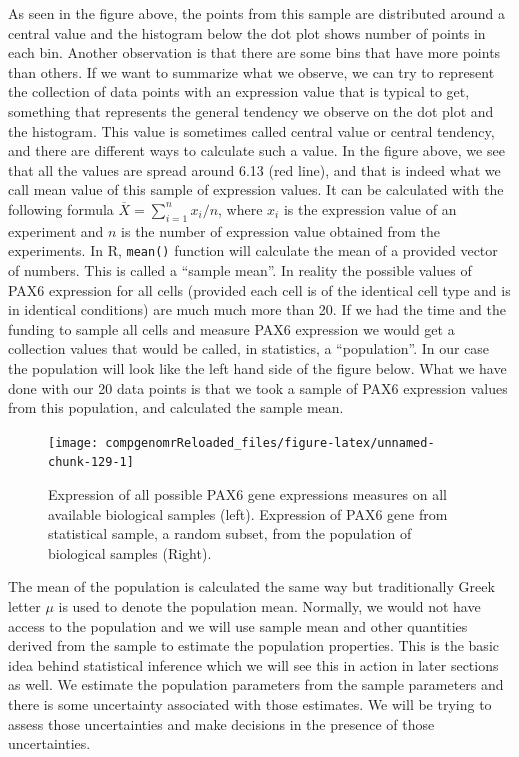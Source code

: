 \documentclass[12pt,]{krantz}
\theoremstyle{definition}
\theoremstyle{definition}
\theoremstyle{definition}
\theoremstyle{remark}
\begin{document}
As seen in the figure above, the points from this sample are distributed
around a central value and the histogram below the dot plot shows number
of points in each bin. Another observation is that there are some bins
that have more points than others. If we want to summarize what we
observe, we can try to represent the collection of data points with an
expression value that is typical to get, something that represents the
general tendency we observe on the dot plot and the histogram. This
value is sometimes called central value or central tendency, and there
are different ways to calculate such a value. In the figure above, we
see that all the values are spread around 6.13 (red line), and that is
indeed what we call mean value of this sample of expression values. It
can be calculated with the following formula
\(\overline{X}=\sum_{i=1}^n x_i/n\), where \(x_i\) is the expression
value of an experiment and \(n\) is the number of expression value
obtained from the experiments. In R, \texttt{mean()} function will
calculate the mean of a provided vector of numbers. This is called a
``sample mean''. In reality the possible values of PAX6 expression for
all cells (provided each cell is of the identical cell type and is in
identical conditions) are much much more than 20. If we had the time and
the funding to sample all cells and measure PAX6 expression we would get
a collection values that would be called, in statistics, a
``population''. In our case the population will look like the left hand
side of the figure below. What we have done with our 20 data points is
that we took a sample of PAX6 expression values from this population,
and calculated the sample mean.

\begin{figure}

{\centering \texttt{[image: compgenomrReloaded\_files/figure-latex/unnamed-chunk-129-1]} 

}

\caption{Expression of all possible PAX6 gene expressions measures on all available biological samples (left). Expression of PAX6 gene from statistical sample, a random subset, from the population of biological samples (Right). }\label{fig:unnamed-chunk-129}
\end{figure}

The mean of the population is calculated the same way but traditionally
Greek letter \(\mu\) is used to denote the population mean. Normally, we
would not have access to the population and we will use sample mean and
other quantities derived from the sample to estimate the population
properties. This is the basic idea behind statistical inference which we
will see this in action in later sections as well. We estimate the
population parameters from the sample parameters and there is some
uncertainty associated with those estimates. We will be trying to assess
those uncertainties and make decisions in the presence of those
uncertainties.
\end{document}

